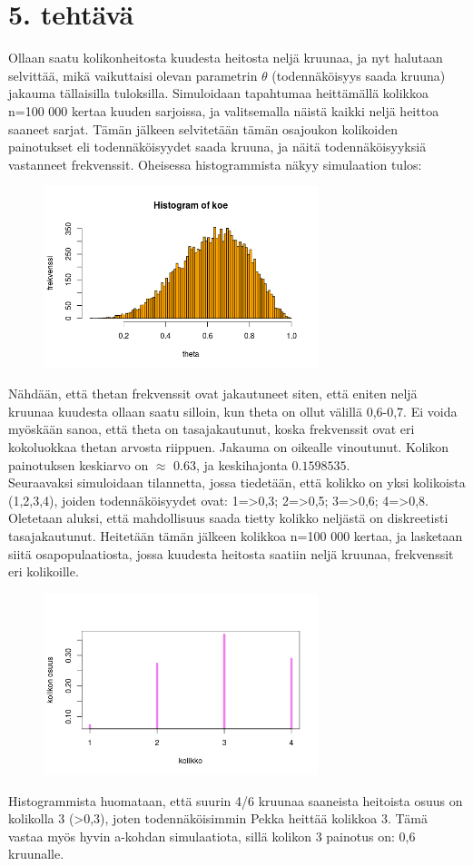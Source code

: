 \documentclass[a4paper]{article}
\begin{document}
\section*{5. tehtävä}
Ollaan saatu kolikonheitosta kuudesta heitosta neljä kruunaa, ja nyt halutaan selvittää, mikä vaikuttaisi olevan parametrin \(\theta\) (todennäköisyys saada kruuna) jakauma tällaisilla tuloksilla. Simuloidaan tapahtumaa heittämällä kolikkoa n=100 000 kertaa kuuden sarjoissa, ja valitsemalla näistä kaikki neljä heittoa saaneet sarjat. Tämän jälkeen selvitetään tämän osajoukon kolikoiden painotukset eli todennäköisyydet saada kruuna, ja näitä todennäköisyyksiä vastanneet frekvenssit. Oheisessa histogrammista näkyy simulaation tulos:
\begin{figure}[H]
\includegraphics[width=8cm]{260517_5a.png}
\end{figure}
Nähdään, että thetan frekvenssit ovat jakautuneet siten, että eniten neljä kruunaa kuudesta ollaan saatu silloin, kun theta on ollut välillä 0,6-0,7. Ei voida myöskään sanoa, että theta on tasajakautunut, koska frekvenssit ovat eri kokoluokkaa thetan arvosta riippuen. Jakauma on oikealle vinoutunut. Kolikon painotuksen keskiarvo on \(\approx\) 0.63, ja keskihajonta \(0.1598535\). \\

Seuraavaksi simuloidaan tilannetta, jossa tiedetään, että kolikko on yksi kolikoista (1,2,3,4), joiden todennäköisyydet ovat: 1=>0,3; 2=>0,5; 3=>0,6; 4=>0,8. Oletetaan aluksi, että mahdollisuus saada tietty kolikko neljästä on diskreetisti tasajakautunut. Heitetään tämän jälkeen kolikkoa n=100 000 kertaa, ja lasketaan siitä osapopulaatiosta, jossa kuudesta heitosta saatiin neljä kruunaa, frekvenssit eri kolikoille.
\begin{figure}[H]
\includegraphics[width=8cm]{260517_5b.png}
\end{figure}
Histogrammista huomataan, että suurin 4/6 kruunaa saaneista heitoista osuus on kolikolla 3 (>0,3), joten todennäköisimmin Pekka heittää kolikkoa 3. Tämä vastaa myös hyvin a-kohdan simulaatiota, sillä kolikon 3 painotus on: 0,6 kruunalle.
\end{document}
